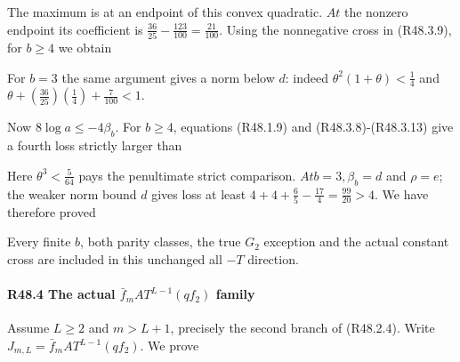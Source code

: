 The maximum is at an endpoint of this convex quadratic. \(At\) the nonzero endpoint its coefficient is \(\frac{36}{25}-\frac{123}{100}=\frac{21}{100}\). Using the nonnegative cross in (R48.3.9), for \(b\ge 4\) we obtain


For \(b=3\) the same argument gives a norm below \(d\): indeed \(\theta^2(1+\theta)<\frac{1}{4}\) and \(\theta+(\frac{36}{25})(\frac{1}{4})+\frac{7}{100}<1\).

Now \(8 \log a \le  -4 \beta_b\). For \(b\ge 4\), equations (R48.1.9) and (R48.3.8)-(R48.3.13) give a fourth loss strictly larger than


Here \(\theta^3<\frac{5}{64}\) pays the penultimate strict comparison. \(At b=3,\allowbreak \allowbreak  \beta_b=d\) and \(\rho=e\); the weaker norm bound \(d\) gives loss at least \(4+4+\frac{6}{5}-\frac{17}{4}=\frac{99}{20}>4\). We have therefore proved


Every finite \(b\), both parity classes, the true \(G_{2}\) exception and the actual constant cross are included in this unchanged all \(-T\) direction.

\paragraph{R48.4 The actual \(\bar f_m A T^{L-1}\label{part:R48.4}(q f_{2})\) family}

Assume \(L\ge 2\) and \(m>L+1\), precisely the second branch of (R48.2.4). Write \(J_{m,\allowbreak \allowbreak L}=\bar f_m A T^{L-1}(q f_{2})\). We prove


